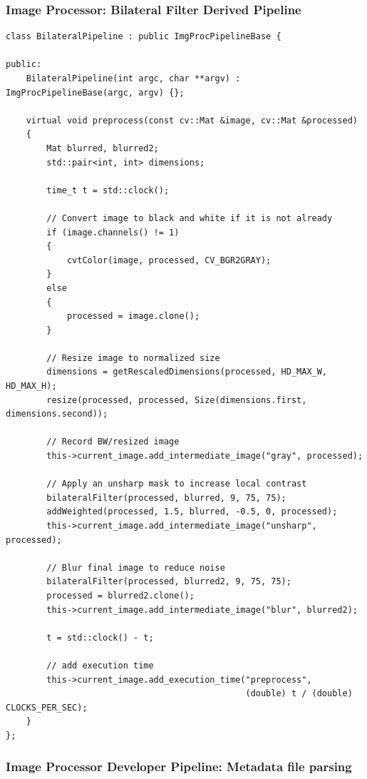 \documentclass[10pt, onecolumn, draftclsnofoot, letterpaper, compsoc]{IEEEtran}
\begin{document}
\newpage
\subsubsection{Image Processor: Bilateral Filter Derived Pipeline}

\begin{verbatim}
class BilateralPipeline : public ImgProcPipelineBase {

public:
    BilateralPipeline(int argc, char **argv) : ImgProcPipelineBase(argc, argv) {};

    virtual void preprocess(const cv::Mat &image, cv::Mat &processed)
    {
        Mat blurred, blurred2;
        std::pair<int, int> dimensions;

        time_t t = std::clock();

        // Convert image to black and white if it is not already
        if (image.channels() != 1)
        {
            cvtColor(image, processed, CV_BGR2GRAY);
        }
        else
        {
            processed = image.clone();
        }

        // Resize image to normalized size
        dimensions = getRescaledDimensions(processed, HD_MAX_W, HD_MAX_H);
        resize(processed, processed, Size(dimensions.first, dimensions.second));

        // Record BW/resized image
        this->current_image.add_intermediate_image("gray", processed);

        // Apply an unsharp mask to increase local contrast
        bilateralFilter(processed, blurred, 9, 75, 75);
        addWeighted(processed, 1.5, blurred, -0.5, 0, processed);
        this->current_image.add_intermediate_image("unsharp", processed);

        // Blur final image to reduce noise
        bilateralFilter(processed, blurred2, 9, 75, 75);
        processed = blurred2.clone();
        this->current_image.add_intermediate_image("blur", blurred2);

        t = std::clock() - t;

        // add execution time
        this->current_image.add_execution_time("preprocess",
                                               (double) t / (double) CLOCKS_PER_SEC);
    }
};
\end{verbatim}

\newpage
\subsubsection{Image Processor Developer Pipeline: Metadata file parsing}
\end{document}
